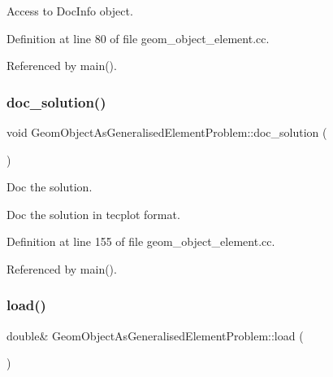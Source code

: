 Access to Doc\+Info object. 



Definition at line 80 of file geom\+\_\+object\+\_\+element.\+cc.



Referenced by main().

\mbox{\label{classGeomObjectAsGeneralisedElementProblem_a5092be8e6172d6c9147115bdd485db35}} 
\subsubsection{\texorpdfstring{doc\+\_\+solution()}{doc\_solution()}}
{\footnotesize\ttfamily void Geom\+Object\+As\+Generalised\+Element\+Problem\+::doc\+\_\+solution (\begin{DoxyParamCaption}{ }\end{DoxyParamCaption})}



Doc the solution. 

Doc the solution in tecplot format. 

Definition at line 155 of file geom\+\_\+object\+\_\+element.\+cc.



Referenced by main().

\mbox{\label{classGeomObjectAsGeneralisedElementProblem_a5ae799de23742e4c8fa54ee7ae32e679}} 
\subsubsection{\texorpdfstring{load()}{load()}}
{\footnotesize\ttfamily double\& Geom\+Object\+As\+Generalised\+Element\+Problem\+::load (\begin{DoxyParamCaption}{ }\end{DoxyParamCaption})\hspace{0.3cm}{\ttfamily [inline]}}



